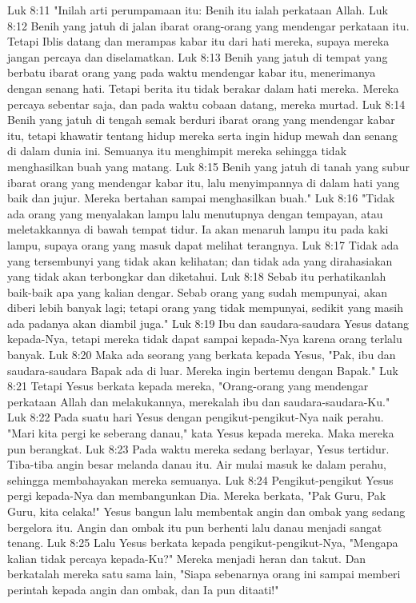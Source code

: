 Luk 8:11  "Inilah arti perumpamaan itu: Benih itu ialah perkataan Allah.
Luk 8:12  Benih yang jatuh di jalan ibarat orang-orang yang mendengar perkataan itu. Tetapi Iblis datang dan merampas kabar itu dari hati mereka, supaya mereka jangan percaya dan diselamatkan.
Luk 8:13  Benih yang jatuh di tempat yang berbatu ibarat orang yang pada waktu mendengar kabar itu, menerimanya dengan senang hati. Tetapi berita itu tidak berakar dalam hati mereka. Mereka percaya sebentar saja, dan pada waktu cobaan datang, mereka murtad.
Luk 8:14  Benih yang jatuh di tengah semak berduri ibarat orang yang mendengar kabar itu, tetapi khawatir tentang hidup mereka serta ingin hidup mewah dan senang di dalam dunia ini. Semuanya itu menghimpit mereka sehingga tidak menghasilkan buah yang matang.
Luk 8:15  Benih yang jatuh di tanah yang subur ibarat orang yang mendengar kabar itu, lalu menyimpannya di dalam hati yang baik dan jujur. Mereka bertahan sampai menghasilkan buah."
Luk 8:16  "Tidak ada orang yang menyalakan lampu lalu menutupnya dengan tempayan, atau meletakkannya di bawah tempat tidur. Ia akan menaruh lampu itu pada kaki lampu, supaya orang yang masuk dapat melihat terangnya.
Luk 8:17  Tidak ada yang tersembunyi yang tidak akan kelihatan; dan tidak ada yang dirahasiakan yang tidak akan terbongkar dan diketahui.
Luk 8:18  Sebab itu perhatikanlah baik-baik apa yang kalian dengar. Sebab orang yang sudah mempunyai, akan diberi lebih banyak lagi; tetapi orang yang tidak mempunyai, sedikit yang masih ada padanya akan diambil juga."
Luk 8:19  Ibu dan saudara-saudara Yesus datang kepada-Nya, tetapi mereka tidak dapat sampai kepada-Nya karena orang terlalu banyak.
Luk 8:20  Maka ada seorang yang berkata kepada Yesus, "Pak, ibu dan saudara-saudara Bapak ada di luar. Mereka ingin bertemu dengan Bapak."
Luk 8:21  Tetapi Yesus berkata kepada mereka, "Orang-orang yang mendengar perkataan Allah dan melakukannya, merekalah ibu dan saudara-saudara-Ku."
Luk 8:22  Pada suatu hari Yesus dengan pengikut-pengikut-Nya naik perahu. "Mari kita pergi ke seberang danau," kata Yesus kepada mereka. Maka mereka pun berangkat.
Luk 8:23  Pada waktu mereka sedang berlayar, Yesus tertidur. Tiba-tiba angin besar melanda danau itu. Air mulai masuk ke dalam perahu, sehingga membahayakan mereka semuanya.
Luk 8:24  Pengikut-pengikut Yesus pergi kepada-Nya dan membangunkan Dia. Mereka berkata, "Pak Guru, Pak Guru, kita celaka!" Yesus bangun lalu membentak angin dan ombak yang sedang bergelora itu. Angin dan ombak itu pun berhenti lalu danau menjadi sangat tenang.
Luk 8:25  Lalu Yesus berkata kepada pengikut-pengikut-Nya, "Mengapa kalian tidak percaya kepada-Ku?" Mereka menjadi heran dan takut. Dan berkatalah mereka satu sama lain, "Siapa sebenarnya orang ini sampai memberi perintah kepada angin dan ombak, dan Ia pun ditaati!"
